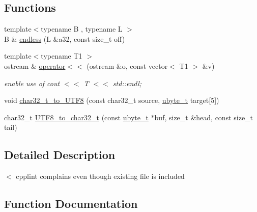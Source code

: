 \subsection*{Functions}
\begin{DoxyCompactItemize}
\item 
{\footnotesize template$<$typename B , typename L $>$ }\\B \& \hyperlink{namespacejlettvin_a22a95d44fbce8da6d460dbad5bddb41a}{endless} (L \&a32, const size\+\_\+t off)
\item 
\hypertarget{namespacejlettvin_ae776f6a66f5697c5cb2afb2c6efdbfd7}{}{\footnotesize template$<$typename T1 $>$ }\\ostream \& \hyperlink{namespacejlettvin_ae776f6a66f5697c5cb2afb2c6efdbfd7}{operator$<$$<$} (ostream \&o, const vector$<$ T1 $>$ \&v)\label{namespacejlettvin_ae776f6a66f5697c5cb2afb2c6efdbfd7}

\begin{DoxyCompactList}\small\item\em enable use of cout $<$$<$ T $<$$<$ std\+::endl; \end{DoxyCompactList}\item 
void \hyperlink{namespacejlettvin_ab09212af893947acc85d4e6138b60ba2}{char32\+\_\+t\+\_\+to\+\_\+\+U\+T\+F8} (const char32\+\_\+t source, \hyperlink{namespacejlettvin_a7c7cf84f4fd67858c46a1077ed2e3ad4}{ubyte\+\_\+t} target\mbox{[}5\mbox{]})
\item 
char32\+\_\+t \hyperlink{namespacejlettvin_ae1f5a0c22c3f8c9eecb88f086bcbcc30}{U\+T\+F8\+\_\+to\+\_\+char32\+\_\+t} (const \hyperlink{namespacejlettvin_a7c7cf84f4fd67858c46a1077ed2e3ad4}{ubyte\+\_\+t} $\ast$buf, size\+\_\+t \&head, const size\+\_\+t tail)
\end{DoxyCompactItemize}


\subsection{Detailed Description}
$<$ cpplint complains even though existing file is included 

\subsection{Function Documentation}
\hypertarget{namespacejlettvin_ab09212af893947acc85d4e6138b60ba2}{}

